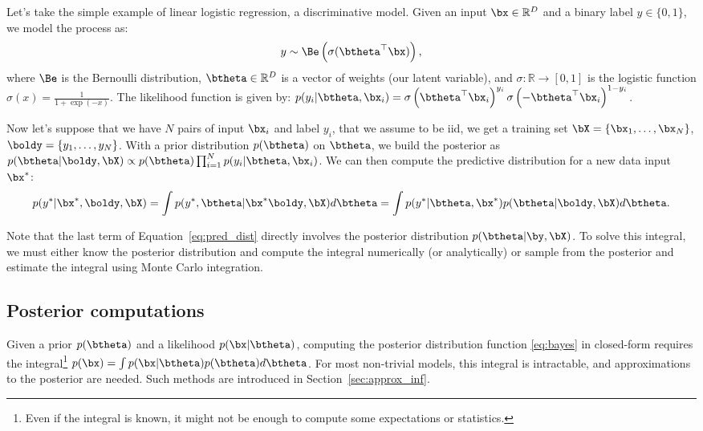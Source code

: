 Let's take the simple example of linear logistic regression, a discriminative model.
Given an input $\bx \in \mathbb{R}^D$ and a binary label $y\in \{ 0, 1\}$, we model the process as:
\begin{align}
    y \sim \Be\left(\sigma(\btheta^\top \bx)\right),
\end{align}
where $\Be$ is the Bernoulli distribution, $\btheta\in\mathbb{R}^D$ is a vector of weights (our latent variable), and $\sigma : \mathbb{R} \to [0, 1]$ is the logistic function $\sigma(x) = \frac{1}{1 + \exp(-x)}$.
The likelihood function is given by: $p(y_i|\btheta,\bx_i) =\sigma\left(\btheta^\top \bx_i\right)^{y_i}\sigma\left(-\btheta^\top \bx_i\right)^{1-y_i}$.

Now let's suppose that we have $N$ pairs of input $\bx_i$ and label $y_i$, that we assume to be \ac{iid}, we get a training set $\bX = \{\bx_1,\ldots,\bx_N\}$, $\boldy = \{y_1,\ldots,y_N\}$.
With a prior distribution $p(\btheta)$ on $\btheta$, we build the posterior as $p(\btheta|\boldy,\bX) \propto p(\btheta)\prod_{i=1}^N p(y_i|\btheta, \bx_i)$.
We can then compute the predictive distribution for a new data input $\bx^*$:
\begin{align}
p(y^*|\bx^*,\boldy,\bX) = \int p(y^*, \btheta|\bx^*\boldy, \bX)d\btheta = \int p(y^*|\btheta,\bx^*) p(\btheta|\boldy,\bX)d\btheta.\label{eq:pred_dist}
\end{align}

Note that the last term of Equation~\eqref{eq:pred_dist} directly involves the posterior distribution $p(\btheta|\by,\bX)$.
To solve this integral, we must either know the posterior distribution and compute the integral numerically (or analytically) or sample from the posterior and estimate the integral using Monte Carlo integration.

\subsection{Posterior computations}
\label{sec:posterior}
Given a prior $p(\btheta)$ and a likelihood $p(\bx|\btheta)$, computing the posterior distribution function \eqref{eq:bayes} in closed-form requires the integral\footnote{Even if the integral is known, it might not be enough to compute some expectations or statistics.} $p(\bx)=\int p(\bx|\btheta)p(\btheta)d\btheta$.
For most non-trivial models, this integral is intractable, and approximations to the posterior are needed.
Such methods are introduced in Section~\ref{sec:approx_inf}.

